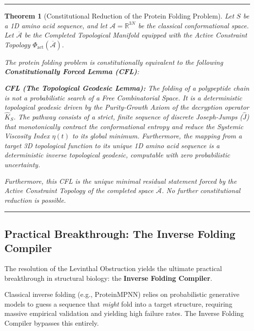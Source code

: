 \documentclass[11pt,openany]{extbook}
\theoremstyle{plain}
\newtheorem{theorem}{Theorem}[chapter]
\theoremstyle{definition}
\begin{document}
\begin{center}
\rule{0.8\textwidth}{0.4pt}
\end{center}

\begin{theorem}[Constitutional Reduction of the Protein Folding Problem]
Let $S$ be a 1D amino acid sequence, and let $\mathcal{A} = \mathbb{R}^{3N}$ be the classical conformational space. Let $\overline{\mathcal{A}}$ be the Completed Topological Manifold equipped with the Active Constraint Topology $\Phi_{\mathrm{act}}(\overline{\mathcal{A}})$.

The protein folding problem is constitutionally equivalent to the following \textbf{Constitutionally Forced Lemma (CFL)}:

\textbf{CFL (The Topological Geodesic Lemma):} \textit{The folding of a polypeptide chain is not a probabilistic search of a Free Combinatorial Space. It is a deterministic topological geodesic driven by the Purity-Growth Axiom of the decryption operator $\hat{K}_S$. The pathway consists of a strict, finite sequence of discrete Joseph-Jumps ($\hat{J}$) that monotonically contract the conformational entropy and reduce the Systemic Viscosity Index $\eta(t)$ to its global minimum. Furthermore, the mapping from a target 3D topological function to its unique 1D amino acid sequence is a deterministic inverse topological geodesic, computable with zero probabilistic uncertainty.}

Furthermore, this CFL is the unique minimal residual statement forced by the Active Constraint Topology of the completed space $\overline{\mathcal{A}}$. No further constitutional reduction is possible.
\end{theorem}

\begin{center}
\rule{0.8\textwidth}{0.4pt}
\end{center}

\subsection{Practical Breakthrough: The Inverse Folding Compiler}

The resolution of the Levinthal Obstruction yields the ultimate practical breakthrough in structural biology: the \textbf{Inverse Folding Compiler}.

Classical inverse folding (e.g., ProteinMPNN) relies on probabilistic generative models to guess a sequence that \textit{might} fold into a target structure, requiring massive empirical validation and yielding high failure rates. The Inverse Folding Compiler bypasses this entirely.
\end{document}
